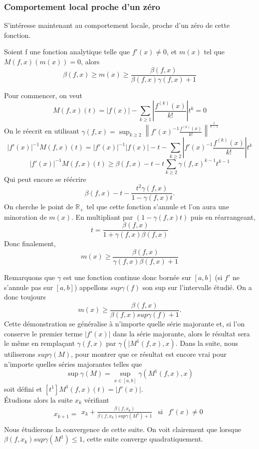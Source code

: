 \documentclass[a4paper,10.5pt]{article}
\begin{document}
	\subsubsection{Comportement local proche d'un zéro}
	S'intéresse maintenant au comportement locale, proche d'un zéro de cette fonction.
	\begin{theorem}
		Soient f une fonction analytique telle que $f'(x)\neq 0$, et $m(x)$ tel que $M(f,x)(m(x))=0$, alors
		\[\beta(f,x) \geq m(x)\geq\frac{\beta(f,x)}{\beta(f,x)\gamma(f,x)+1}\]
	\end{theorem}
	\begin{demonstration}
		
		Pour commencer, on veut  
		\[M(f,x)(t)=|f(x)|-\sum_{k\geq1}|\frac{f^{(k)}(x)}{k!}|t^{k}=0\]
		On le réecrit en utilisant $\gamma(f,x)=\sup_{k \geq 2}\left\|f'(x)^{-1}\frac{f^{(k)}(x)}{k!}\right\|^{\frac{1}{k-1}}$
		\[|f'(x)|^{-1}M(f,x)(t)=|f'(x)|^{-1}|f(x)|-t-\sum_{k\geq2}|f'(x)^{-1}\frac{f^{(k)}(x)}{k!}|t^{k}\]
		\[|f'(x)|^{-1}M(f,x)(t)\geq \beta(f,x)-t-t\sum_{k\geq2}\gamma(f,x)^{k-1}t^{k-1}\]
		Qui peut encore se réécrire
		\[\beta(f,x)-t-\frac{t^2\gamma(f,x)}{1-\gamma(f,x) t}.\]
		On cherche le point de $\mathbb{R}_+$ tel que cette fonction s'annule et l'on aura une minoration de $m(x)$. En multipliant par $(1-\gamma(f,x) t)$ puis en réarrangeant,
		\[t=\frac{\beta(f,x)}{1+\gamma(f,x) \beta(f,x)}\]
		Donc finalement,
		\[m(x)\geq\frac{\beta(f,x)}{\gamma(f,x) \beta(f,x)+1} \]
	\end{demonstration}
	\vspace{7mm}
	Remarquons que $\gamma$ est une fonction continue donc bornée sur $[a,b]$ (si $f'$ ne s'annule pas sur $[a,b]$) appellons $sup\gamma(f)$ son sup sur l'intervalle étudié. On a donc toujours
	\[m(x)\geq\frac{\beta(f,x)}{\beta(f,x)sup\gamma(f)+1}.\]
	Cette démonstration se généralise à n'importe quelle série majorante et, si l'on conserve le premier terme $|f'(x)|$ dans la série majorante, alors le résultat sera le même en remplaçant $\gamma(f,x)$ par $\gamma(|M^1(f,x),x)$. Dans la suite, nous utiliserons $sup\gamma(M)$, pour montrer que ce résultat est encore vrai pour n'importe quelles séries majorantes telles que 
	\[\sup\gamma(M)=\sup_{x\in[a,b]}\gamma(M^1(f,x),x) \]
	soit défini et $[t^1]M^1(f,x)(t)=|f'(x)|$.
	\\
	Étudions alors la suite $x_k$ vérifiant 
	\begin{equation}
	x_{k+1}=
	\begin{array}{ccc}
	x_k+\frac{\beta(f,x_k)}{\beta(f,x_k)sup\gamma(M^1)+1} & \mbox{si} & f'(x)\neq 0\\
	\end{array}
	\end{equation}
	Nous étudierons la convergence de cette suite. On voit clairement que lorsque $\beta(f,x_k)sup\gamma(M^1)\leq 1$, cette suite converge quadratiquement.
	
\end{document}

